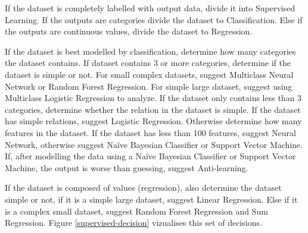 \documentclass[a4paper,titlepage]{article}
\begin{document}
If the dataset is completely labelled with output data, divide it into Supervised Learning. 
If the outputs are categories divide the dataset to Classification. 
Else if the outputs are continuous values, divide the dataset to Regression.

If the dataset is best modelled by classification, determine how many categories the dataset contains. 
If dataset contains 3 or more categories, determine if the dataset is simple or not. 
For small complex datasets, suggest Multiclass Neural Network or Random Forest Regression. 
For simple large dataset, suggest using Multiclass Logistic Regression to analyze. 
If the dataset only contains less than 3 categories, determine whether the relation in the dataset is simple. 
If the dataset has simple relations, suggest Logistic Regression. Otherwise determine how many features in the dataset. 
If the dataset has less than 100 features, suggest Neural Network, otherwise suggest Naïve Bayesian Classifier or Support Vector Machine. 
If, after modelling the data using a Naïve Bayesian Classifier or Support Vector Machine, the output is worse than guessing, suggest Anti-learning.

If the dataset is composed of values (regression), also determine the dataset simple or not, if it is a simple large dataset, suggest Linear Regression. 
Else if it is a complex small dataset, suggest Random Forest Regression and Sum Regression. 
Figure \ref{supervised-decision} vizualises this set of decisions.
\end{document}
